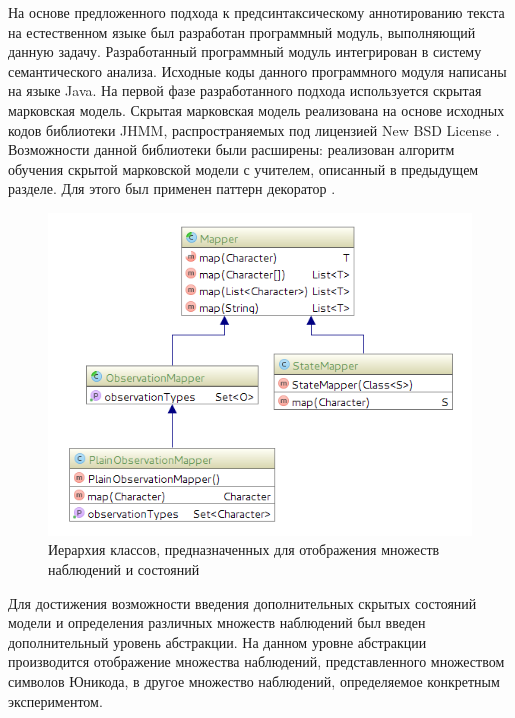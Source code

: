 На основе предложенного подхода к предсинтаксическому аннотированию текста на естественном языке был разработан программный модуль, выполняющий данную задачу. Разработанный программный модуль интегрирован в систему семантического анализа. Исходные коды данного программного модуля написаны на языке Java. На первой фазе разработанного подхода используется скрытая марковская модель. Скрытая марковская модель реализована на основе исходных кодов библиотеки JHMM, распространяемых под лицензией New BSD License \cite{nbsd}. Возможности данной библиотеки были расширены: реализован алгоритм обучения скрытой марковской модели с учителем, описанный в предыдущем разделе. Для этого был применен паттерн декоратор \cite{gof}.
\begin{figure}[H]
	\centering
	\includegraphics[scale=0.7]{img/uml_mappers.png}
	\caption{Иерархия классов, предназначенных для отображения множеств наблюдений и состояний}
\end{figure}
Для достижения возможности введения дополнительных скрытых состояний модели и определения различных множеств наблюдений был введен дополнительный уровень абстракции. На данном уровне абстракции производится отображение множества наблюдений, представленного множеством символов Юникода, в другое множество наблюдений, определяемое конкретным экспериментом. 

